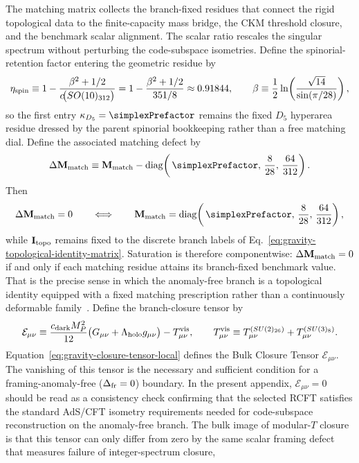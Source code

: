 \documentclass[11pt]{article}
\begin{document}
The matching matrix collects the branch-fixed residues that connect the rigid
topological data to the finite-capacity mass bridge, the CKM threshold
closure, and the benchmark scalar alignment. The scalar ratio rescales the
singular spectrum without perturbing the code-subspace isometries. Define the
spinorial-retention factor entering the geometric residue by
\begin{equation}
\label{eq:gravity-spinorial-retention}
 \eta_{\rm spin}
 \equiv
 1-\frac{\beta^2+1/2}{c\!\bigl(SO(10)_{312}\bigr)}
 =
 1-\frac{\beta^2+1/2}{351/8}
 \approx
 0.91844,
 \qquad
 \beta\equiv \frac12\ln\!\left(\frac{\sqrt{14}}{\sin(\pi/28)}\right),
\end{equation}
so the first entry $\kappa_{D_5}=\simplexPrefactor$ remains the fixed
$D_5$ hyperarea residue dressed by the parent spinorial bookkeeping rather
than a free matching dial. Define the
associated matching defect by
\begin{equation}
\label{eq:gravity-topological-identity-defect}
 \Delta \mathbf M_{\rm match}
 \equiv
 \mathbf M_{\rm match}
 -
 \operatorname{diag}\!\left(
 \,\simplexPrefactor,
 \,\frac{8}{28},
 \,\frac{64}{312}
 \right).
\end{equation}
Then
\begin{equation}
\label{eq:gravity-topological-identity-saturation}
 \Delta \mathbf M_{\rm match}=0
 \qquad\Longleftrightarrow\qquad
 \mathbf M_{\rm match}
 =
 \operatorname{diag}\!\left(
 \,\simplexPrefactor,
 \,\frac{8}{28},
 \,\frac{64}{312}
 \right),
\end{equation}
while $\mathbf I_{\rm topo}$ remains fixed to the discrete branch labels of
Eq.~\eqref{eq:gravity-topological-identity-matrix}. Saturation is therefore
componentwise: $\Delta\mathbf M_{\rm match}=0$ if and only if each matching
residue attains its branch-fixed benchmark value. That is the precise sense in
which the anomaly-free branch is a topological identity equipped with a fixed
matching prescription rather than a continuously deformable family~\cite{georgi1979,babu1993,friedan1987,witten1989}.
Define the branch-closure tensor by
\begin{equation}
\label{eq:gravity-closure-tensor-local}
 \mathcal E_{\mu\nu}
 \equiv
 \frac{c_{\rm dark}M_P^2}{12}\bigl(G_{\mu\nu}+\Lambda_{\rm holo}g_{\mu\nu}\bigr)
 -T^{\rm vis}_{\mu\nu},
 \qquad
 T^{\rm vis}_{\mu\nu}
 \equiv
 T^{(SU(2)_{26})}_{\mu\nu}+T^{(SU(3)_8)}_{\mu\nu}.
\end{equation}
Equation~\eqref{eq:gravity-closure-tensor-local} defines the Bulk Closure Tensor $\mathcal E_{\mu\nu}$. The vanishing of this tensor is the necessary and sufficient condition for a framing-anomaly-free ($\Delta_{\rm fr}=0$) boundary. In the present appendix, $\mathcal E_{\mu\nu}=0$ should be read as a consistency check confirming that the selected RCFT satisfies the standard AdS/CFT isometry requirements needed for code-subspace reconstruction on the anomaly-free branch. The bulk image of modular-$T$ closure is that this tensor can only differ from zero by the same scalar framing defect that measures failure of integer-spectrum closure,
\end{document}
